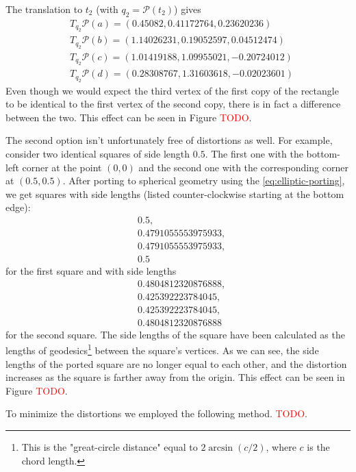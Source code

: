 The translation to $t_2$ (with $q_2 = \mathcal{P}(t_2)$) gives
\begin{equation*}
    \begin{split}
         & T_{q_2}\mathcal{P}(a) =(0.45082,    0.41172764, 0.23620236)    \\
         & T_{q_2}\mathcal{P}(b) =(1.14026231, 0.19052597, 0.04512474)    \\
         & T_{q_2}\mathcal{P}(c) =( 1.01419188,  1.09955021, -0.20724012) \\
         & T_{q_2}\mathcal{P}(d) =( 0.28308767,  1.31603618, -0.02023601)
    \end{split}
\end{equation*}
Even though we would expect the third vertex of the first copy of the rectangle to be identical to the first vertex of the second copy, there is in fact a difference between the two.
This effect can be seen in Figure \textcolor{red}{TODO}.

The second option isn't unfortunately free of distortions as well.
For example, consider two identical squares of side length $0.5$.
The first one with the bottom-left corner at the point $(0,0)$ and the second one with the corresponding corner at $(0.5, 0.5)$.
After porting to spherical geometry using the \autoref{eq:elliptic-porting}, we get squares with side lengths (listed counter-clockwise starting at the bottom edge):
\begin{equation*}
    \begin{split}
         & 0.5 ,                \\
         & 0.4791055553975933 , \\
         & 0.4791055553975933 , \\
         & 0.5
    \end{split}
\end{equation*}
for the first square and with side lengths
\begin{equation*}
    \begin{split}
         & 0.4804812320876888, \\
         & 0.425392223784045,  \\
         & 0.425392223784045,  \\
         & 0.4804812320876888
    \end{split}
\end{equation*}
for the second square.
The side lengths of the square have been calculated as the lengths of geodesics\footnote{This is the "great-circle distance" equal to $2 \arcsin{(c / 2)}$, where $c$ is the chord length.} between the square's vertices.
As we can see, the side lengths of the ported square are no longer equal to each other, and the distortion increases as the square is farther away from the origin.
This effect can be seen in Figure \textcolor{red}{TODO}.

To minimize the distortions we employed the following method. \textcolor{red}{TODO}.